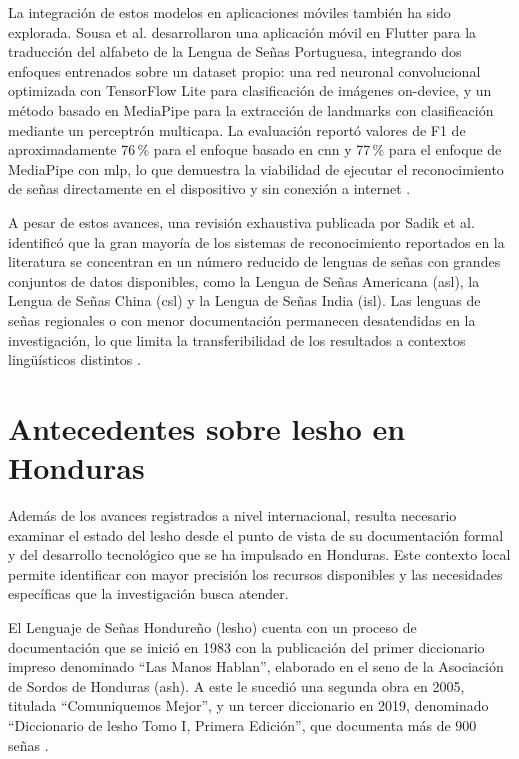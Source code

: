 La integración de estos modelos en aplicaciones móviles también ha sido explorada.
Sousa et al. desarrollaron una aplicación móvil en Flutter para la traducción del
alfabeto de la Lengua de Señas Portuguesa, integrando dos enfoques entrenados sobre
un dataset propio: una red neuronal convolucional optimizada con TensorFlow Lite para
clasificación de imágenes on-device, y un método basado en MediaPipe para la extracción
de landmarks con clasificación mediante un perceptrón multicapa. La evaluación reportó
valores de F1 de aproximadamente 76\,\% para el enfoque basado en \acrshort{cnn} y 77\,\% para el
enfoque de MediaPipe con \acrshort{mlp}, lo que demuestra la viabilidad de ejecutar el reconocimiento
de señas directamente en el dispositivo y sin conexión a internet \cite{sousa_lgp_flutter_2025}.

A pesar de estos avances, una revisión exhaustiva publicada por Sadik et al. identificó que
la gran mayoría de los sistemas de reconocimiento reportados en la literatura se concentran
en un número reducido de lenguas de señas con grandes conjuntos de datos disponibles,
como la Lengua de Señas Americana (\acrshort{asl}), la Lengua de Señas China (\acrshort{csl}) y la Lengua
de Señas India (\acrshort{isl}). Las lenguas de señas regionales o con menor documentación
permanecen desatendidas en la investigación, lo que limita la transferibilidad de los
resultados a contextos lingüísticos distintos \cite{sadik_survey_2025}.

\section{Antecedentes sobre \acrshort{lesho} en Honduras}

Además de los avances registrados a nivel internacional, resulta necesario examinar el
estado del \acrshort{lesho} desde el punto de vista de su documentación formal y del desarrollo
tecnológico que se ha impulsado en Honduras. Este contexto local permite identificar con
mayor precisión los recursos disponibles y las necesidades específicas que la investigación
busca atender.

El Lenguaje de Señas Hondureño (\acrshort{lesho}) cuenta con un proceso de documentación que se
inició en 1983 con la publicación del primer diccionario impreso denominado ``Las Manos
Hablan'', elaborado en el seno de la Asociación de Sordos de Honduras (\acrshort{ash}). A este le
sucedió una segunda obra en 2005, titulada ``Comuniquemos Mejor'', y un tercer diccionario
en 2019, denominado ``Diccionario de \acrshort{lesho} Tomo I, Primera Edición'', que documenta
más de 900 señas \cite{ash_diccionario_2019}.

